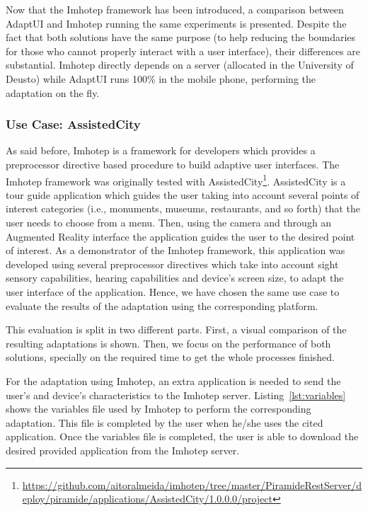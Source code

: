 Now that the Imhotep framework has been introduced, a comparison between AdaptUI and
Imhotep running the same experiments is presented. Despite the fact that both solutions
have the same purpose (to help reducing the boundaries for those who cannot
properly interact with a user interface), their differences are substantial.
Imhotep directly depends on a server (allocated in the University of Deusto)
while AdaptUI runs 100\% in the mobile phone, performing the adaptation on the
fly. 

\subsubsection{Use Case: AssistedCity}
\label{sec:assisted_city_use_case}

As said before, Imhotep is a framework for developers which provides a 
preprocessor directive based procedure to build adaptive user interfaces. The 
Imhotep framework was originally tested with AssistedCity\footnote{\url{
https://github.com/aitoralmeida/imhotep/tree/master/PiramideRestServer/deploy/piramide/applications/AssistedCity/1.0.0.0/project}}. 
AssistedCity is a tour 
guide application which guides the user taking into account several points of interest 
categories (i.e., monuments, museums, restaurants, and so forth) that the user 
needs to choose from a menu. Then, using the camera and through an Augmented 
Reality interface the application guides the user to the desired point of 
interest. As a demonstrator of the Imhotep framework, this application was 
developed using several preprocessor directives which take into account sight 
sensory capabilities, hearing capabilities and device's screen size, to adapt 
the user interface of the application. Hence, we have chosen the same use case to 
evaluate the results of the adaptation using the corresponding platform.

This evaluation is split in two different parts. First, a visual comparison of
the resulting adaptations is shown. Then, we focus on the performance of both
solutions, specially on the required time to get the whole processes finished.

For the adaptation using Imhotep, an extra application is needed to send the 
user's and device's characteristics to the Imhotep server. 
Listing~\ref{lst:variables} shows the variables file used by Imhotep to perform
the corresponding adaptation. This file is completed by the user when he/she 
uses the cited application. Once the variables file is completed, the user is 
able to download the desired provided application from the Imhotep server.


